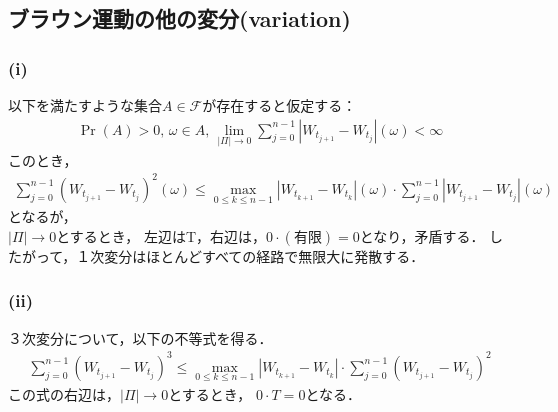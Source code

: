 \documentclass[a4paper,11pt]{jsarticle}
\newcommand{\F}{\mathcal{F}}
\newcommand{\1}{\mbox{1}\hspace{-0.30em}\mbox{1}}
\begin{document}
\subsection{ブラウン運動の他の変分(variation)} %
\subsubsection{(i)}
以下を満たすような集合$A\in\F$が存在すると仮定する：\\
\begin{align*}
  \Pr(A)>0, \, \omega \in A, \,
  \lim_{|\Pi| \to 0}\sum_{j=0}^{n-1}|W_{t_{j+1}}-W_{t_{j}}|
  (\omega) < \infty
\end{align*}
このとき，
\begin{align*}
  \sum_{j=0}^{n-1}(W_{t_{j+1}}-W_{t_{j}})^2(\omega) \leq
  \max_{0\leq k\leq n-1}|W_{t_{k+1}}-W_{t_{k}}|(\omega)\cdot
  \sum_{j=0}^{n-1}|W_{t_{j+1}}-W_{t_{j}}|(\omega)
\end{align*}
となるが，\\
$|\Pi| \to 0$とするとき，
左辺はT，右辺は，$0\cdot(有限)=0$となり，矛盾する．
したがって，１次変分はほとんどすべての経路で無限大に発散する．

\subsubsection{(ii)}
３次変分について，以下の不等式を得る．
\begin{align*}
  \sum_{j=0}^{n-1}(W_{t_{j+1}}-W_{t_{j}})^3 \leq
  \max_{0\leq k\leq n-1}|W_{t_{k+1}}-W_{t_{k}}|\cdot
  \sum_{j=0}^{n-1}(W_{t_{j+1}}-W_{t_{j}})^2
\end{align*} 
この式の右辺は，$|\Pi|\to 0$とするとき，
$0\cdot T=0$となる．
\end{document}
